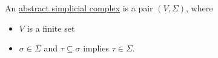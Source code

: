 \begin{definition}\label{def:abstract_simplicial_complexes}\cite[definition 2.1]{Carlsson2009}
  An \uline{abstract simplicial complex} is a pair $(V, \Sigma)$, where
  \begin{itemize}
    \item $V$ is a finite set
    \item $\sigma \in \Sigma$ and $\tau \subseteq \sigma$ implies $\tau \in \Sigma$.
  \end{itemize}
\end{definition}
